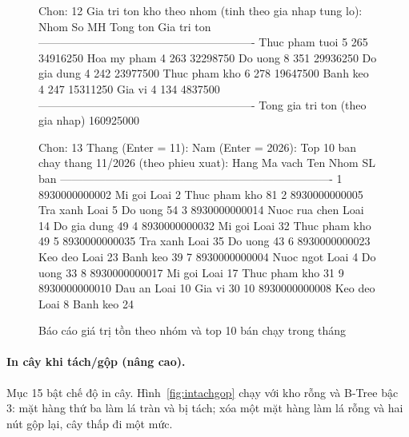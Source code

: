 \begin{figure}[htbp]
\begin{manhinh}
Chon: 12
Gia tri ton kho theo nhom (tinh theo gia nhap tung lo):
Nhom                   So MH    Tong ton       Gia tri ton
----------------------------------------------------------
Thuc pham tuoi             5         265          34916250
Hoa my pham                4         263          32298750
Do uong                    8         351          29936250
Do gia dung                4         242          23977500
Thuc pham kho              6         278          19647500
Banh keo                   4         247          15311250
Gia vi                     4         134           4837500
----------------------------------------------------------
Tong gia tri ton (theo gia nhap)                 160925000

Chon: 13
Thang (Enter = 11):
Nam (Enter = 2026):
Top 10 ban chay thang 11/2026 (theo phieu xuat):
Hang  Ma vach        Ten                       Nhom                SL ban
-------------------------------------------------------------------------
1     8930000000002  Mi goi Loai 2             Thuc pham kho           81
2     8930000000005  Tra xanh Loai 5           Do uong                 54
3     8930000000014  Nuoc rua chen Loai 14     Do gia dung             49
4     8930000000032  Mi goi Loai 32            Thuc pham kho           49
5     8930000000035  Tra xanh Loai 35          Do uong                 43
6     8930000000023  Keo deo Loai 23           Banh keo                39
7     8930000000004  Nuoc ngot Loai 4          Do uong                 33
8     8930000000017  Mi goi Loai 17            Thuc pham kho           31
9     8930000000010  Dau an Loai 10            Gia vi                  30
10    8930000000008  Keo deo Loai 8            Banh keo                24
\end{manhinh}
\caption{Báo cáo giá trị tồn theo nhóm và top 10 bán chạy trong tháng}
\label{fig:baocao}
\end{figure}

\paragraph{In cây khi tách/gộp (nâng cao).} Mục 15 bật chế độ in cây. Hình~\ref{fig:intachgop} chạy với kho rỗng
và B-Tree bậc 3: mặt hàng thứ ba làm lá tràn và bị tách; xóa một mặt hàng làm lá rỗng và hai nút gộp lại,
cây thấp đi một mức.

